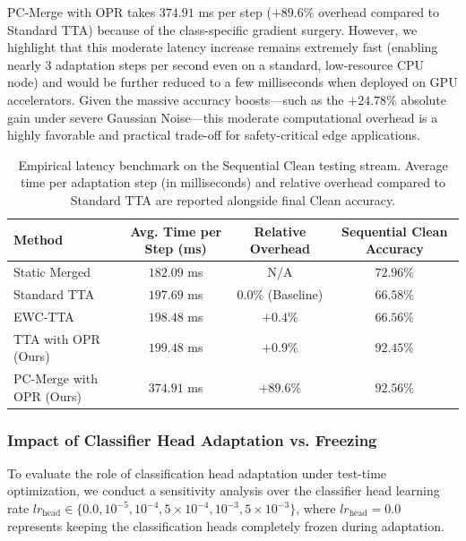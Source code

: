 \documentclass{article}
\theoremstyle{plain}
\theoremstyle{definition}
\theoremstyle{remark}
\begin{document}
PC-Merge with OPR takes $374.91$ ms per step ($+89.6\%$ overhead compared to Standard TTA) because of the class-specific gradient surgery. However, we highlight that this moderate latency increase remains extremely fast (enabling nearly 3 adaptation steps per second even on a standard, low-resource CPU node) and would be further reduced to a few milliseconds when deployed on GPU accelerators. Given the massive accuracy boosts—such as the $+24.78\%$ absolute gain under severe Gaussian Noise—this moderate computational overhead is a highly favorable and practical trade-off for safety-critical edge applications.

\begin{table}[t]
\caption{Empirical latency benchmark on the Sequential Clean testing stream. Average time per adaptation step (in milliseconds) and relative overhead compared to Standard TTA are reported alongside final Clean accuracy.}
\label{tab:latency}
\vskip 0.1in
\begin{center}
\begin{small}
\scshape
\begin{tabular}{lccc}
\toprule
Method & Avg. Time per Step (ms) & Relative Overhead & Sequential Clean Accuracy \\
\midrule
Static Merged & $182.09$ ms & N/A & $72.96\%$ \\
Standard TTA & $197.69$ ms & $0.0\%$ (Baseline) & $66.58\%$ \\
EWC-TTA & $198.48$ ms & $+0.4\%$ & $66.56\%$ \\
TTA with OPR (Ours) & $199.48$ ms & $+0.9\%$ & $92.45\%$ \\
PC-Merge with OPR (Ours) & $374.91$ ms & $+89.6\%$ & $\mathbf{92.56\%}$ \\
\bottomrule
\end{tabular}
\end{small}
\end{center}
\vskip -0.1in
\end{table}

\subsubsection{Impact of Classifier Head Adaptation vs. Freezing}
To evaluate the role of classification head adaptation under test-time optimization, we conduct a sensitivity analysis over the classifier head learning rate $lr_{\text{head}} \in \{0.0, 10^{-5}, 10^{-4}, 5 \times 10^{-4}, 10^{-3}, 5 \times 10^{-3}\}$, where $lr_{\text{head}} = 0.0$ represents keeping the classification heads completely frozen during adaptation.
\end{document}
